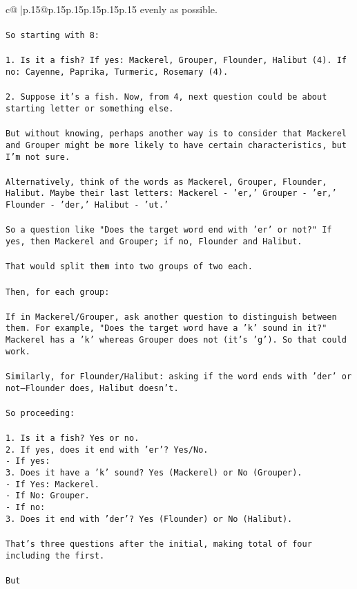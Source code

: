 \documentclass{article}
\begin{document}
{\begin{supertabular}{c@{$\;$}|p{.15\linewidth}@{}p{.15\linewidth}p{.15\linewidth}p{.15\linewidth}p{.15\linewidth}p{.15\linewidth}}
{{{evenly as possible.\\ \tt \\ \tt So starting with 8:\\ \tt \\ \tt 1. Is it a fish? If yes: Mackerel, Grouper, Flounder, Halibut (4). If no: Cayenne, Paprika, Turmeric, Rosemary (4).\\ \tt \\ \tt 2. Suppose it's a fish. Now, from 4, next question could be about starting letter or something else.\\ \tt \\ \tt But without knowing, perhaps another way is to consider that Mackerel and Grouper might be more likely to have certain characteristics, but I'm not sure.\\ \tt \\ \tt Alternatively, think of the words as Mackerel, Grouper, Flounder, Halibut. Maybe their last letters: Mackerel - 'er,' Grouper - 'er,' Flounder - 'der,' Halibut - 'ut.'\\ \tt \\ \tt So a question like "Does the target word end with 'er' or not?" If yes, then Mackerel and Grouper; if no, Flounder and Halibut.\\ \tt \\ \tt That would split them into two groups of two each.\\ \tt \\ \tt Then, for each group:\\ \tt \\ \tt If in Mackerel/Grouper, ask another question to distinguish between them. For example, "Does the target word have a 'k' sound in it?" Mackerel has a 'k' whereas Grouper does not (it's 'g'). So that could work.\\ \tt \\ \tt Similarly, for Flounder/Halibut: asking if the word ends with 'der' or not—Flounder does, Halibut doesn't.\\ \tt \\ \tt So proceeding:\\ \tt \\ \tt 1. Is it a fish? Yes or no.\\ \tt 2. If yes, does it end with 'er'? Yes/No.\\ \tt    - If yes:\\ \tt      3. Does it have a 'k' sound? Yes (Mackerel) or No (Grouper).\\ \tt      - If Yes: Mackerel.\\ \tt      - If No: Grouper.\\ \tt    - If no:\\ \tt      3. Does it end with 'der'? Yes (Flounder) or No (Halibut).\\ \tt \\ \tt That's three questions after the initial, making total of four including the first.\\ \tt \\ \tt But }}}
\end{supertabular}}
\end{document}
